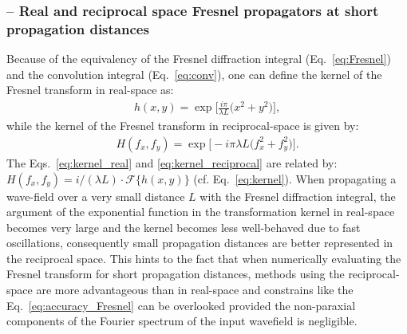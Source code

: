 \begin{refsection}
\subsubsection*{\normalsize -- Real and reciprocal space Fresnel propagators at short propagation distances }

Because of the equivalency of the Fresnel diffraction integral (Eq.~\ref{eq:Fresnel}) and the convolution integral (Eq.~\ref{eq:conv}), one can define the kernel of the Fresnel transform in real-space as:
\begin{align}\label{eq:kernel_real}
    h(x,y)=\exp\bigg[\frac{i\pi}{\lambda L}\big(x^2+y^2 \big)\bigg],
\end{align}{}
while the kernel of the Fresnel transform in reciprocal-space is given by:
\begin{align}\label{eq:kernel_reciprocal}
    H(f_x,f_y)=\exp{\bigg[-i\pi\lambda L\big(f_x^2+f_y^2 \big)\bigg]}.
\end{align}{}
The Eqs.~\ref{eq:kernel_real} and \ref{eq:kernel_reciprocal} are related by: $H(f_x,f_y)=i/(\lambda L)\cdot \mathcal{F}\{ h(x,y)\}$ (cf. Eq.~\ref{eq:kernel}). When propagating a wave-field over a very small distance $L$ with the Fresnel diffraction integral, the argument of the exponential function in the transformation kernel in real-space becomes very large and the kernel becomes less well-behaved due to fast oscillations, consequently small propagation distances are better represented in the reciprocal space. This hints to the fact that when numerically evaluating the Fresnel transform for short propagation distances, methods using the reciprocal-space are more advantageous than in real-space and constrains like the Eq.~\ref{eq:accuracy_Fresnel} can be overlooked provided the non-paraxial components of the Fourier spectrum of the input wavefield is negligible.



\end{refsection}
